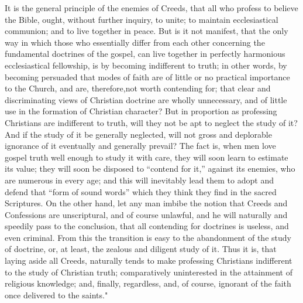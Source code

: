\documentclass[
]{book}
\begin{document}
It is the general principle of the enemies of Creeds, that all who profess to believe the Bible, ought, without further inquiry, to unite; to maintain ecclesiastical communion; and to live together in peace. But is it not manifest, that the only way in which those who essentially differ from each other concerning the fundamental doctrines of the gospel, can live together in perfectly harmonious ecclesiastical fellowship, is by becoming indifferent to truth; in other words, by becoming persuaded that modes of faith are of little or no practical importance to the Church, and are, therefore,not worth contending for; that clear and discriminating views of Christian doctrine are wholly unnecessary, and of little use in the formation of Christian character? But in proportion as professing Christians are indifferent to truth, will they not be apt to neglect the study of it? And if the study of it be generally neglected, will not gross and deplorable ignorance of it eventually and generally prevail? The fact is, when men love gospel truth well enough to study it with care, they will soon learn to estimate its value; they will soon be disposed to ``contend for it,'' against its enemies, who are numerous in every age; and this will inevitably lead them to adopt and defend that ``form of sound words'' which they think they find in the sacred Scriptures. On the other hand, let any man imbibe the notion that Creeds and Confessions are unscriptural, and of course unlawful, and he will naturally and speedily pass to the conclusion, that all contending for doctrines is useless, and even criminal. From this the transition is easy to the abandonment of the study of doctrine, or, at least, the zealous and diligent study of it. Thus it is, that laying aside all Creeds, naturally tends to make professing Christians indifferent to the study of Christian truth; comparatively uninterested in the attainment of religious knowledge; and, finally, regardless, and, of course, ignorant of the faith once delivered to the saints."
\end{document}

